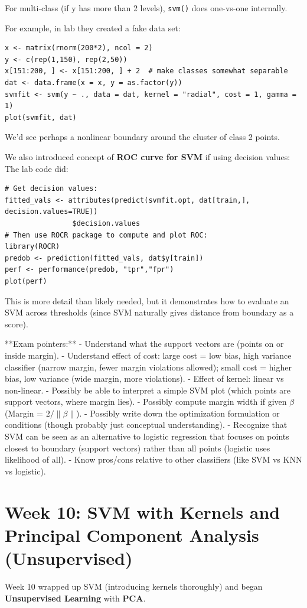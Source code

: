 \documentclass[11pt]{article}
\begin{document}
For multi-class (if y has more than 2 levels), \texttt{svm()} does one-vs-one internally.

For example, in lab they created a fake data set:
\begin{verbatim}
x <- matrix(rnorm(200*2), ncol = 2)
y <- c(rep(1,150), rep(2,50))
x[151:200, ] <- x[151:200, ] + 2  # make classes somewhat separable
dat <- data.frame(x = x, y = as.factor(y))
svmfit <- svm(y ~ ., data = dat, kernel = "radial", cost = 1, gamma = 1)
plot(svmfit, dat)
\end{verbatim}
We'd see perhaps a nonlinear boundary around the cluster of class 2 points.

We also introduced concept of \textbf{ROC curve for SVM} if using decision values:
The lab code did:
\begin{verbatim}
# Get decision values:
fitted_vals <- attributes(predict(svmfit.opt, dat[train,], decision.values=TRUE))
                $decision.values
# Then use ROCR package to compute and plot ROC:
library(ROCR)
predob <- prediction(fitted_vals, dat$y[train])
perf <- performance(predob, "tpr","fpr")
plot(perf)
\end{verbatim}
This is more detail than likely needed, but it demonstrates how to evaluate an SVM across thresholds (since SVM naturally gives distance from boundary as a score).

**Exam pointers:** 
- Understand what the support vectors are (points on or inside margin).
- Understand effect of cost: large cost = low bias, high variance classifier (narrow margin, fewer margin violations allowed); small cost = higher bias, low variance (wide margin, more violations).
- Effect of kernel: linear vs non-linear.
- Possibly be able to interpret a simple SVM plot (which points are support vectors, where margin lies).
- Possibly compute margin width if given $\beta$ (Margin = $2/\|\beta\|$).
- Possibly write down the optimization formulation or conditions (though probably just conceptual understanding).
- Recognize that SVM can be seen as an alternative to logistic regression that focuses on points closest to boundary (support vectors) rather than all points (logistic uses likelihood of all).
- Know pros/cons relative to other classifiers (like SVM vs KNN vs logistic).

\section{Week 10: SVM with Kernels and Principal Component Analysis (Unsupervised)}
Week 10 wrapped up SVM (introducing kernels thoroughly) and began \textbf{Unsupervised Learning} with \textbf{PCA}.
\end{document}
